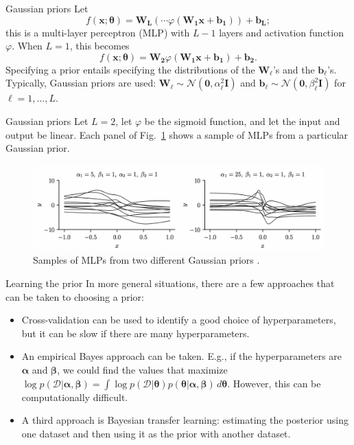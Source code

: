 \documentclass{beamer}
\begin{document}
\begin{frame}{Gaussian priors}
    Let
    \[
    f(\boldsymbol{x}; \boldsymbol{\theta}) = \boldsymbol{W_L}(\cdots\varphi(\boldsymbol{W_1}\boldsymbol{x} + \boldsymbol{b_1})) + \boldsymbol{b_L};
    \]
    this is a multi-layer perceptron (MLP) with $L - 1$ layers and activation function $\varphi$. When $L = 1$, this becomes
    \[
    f(\boldsymbol{x}; \boldsymbol{\theta}) = \boldsymbol{W_2}\varphi(\boldsymbol{W_1}\boldsymbol{x} + \boldsymbol{b_1}) + \boldsymbol{b_2}.
    \]
    Specifying a prior entails specifying the distributions of the $\boldsymbol{W}_{\ell}$'s and the $\boldsymbol{b}_{\ell}$'s. Typically, Gaussian priors are used: $\boldsymbol{W}_{\ell} \sim \mathcal{N}(\boldsymbol{0}, \alpha_{\ell}^2\boldsymbol{I})$ and $\boldsymbol{b}_{\ell} \sim \mathcal{N}(\boldsymbol{0}, \beta_{\ell}^2\boldsymbol{I})$ for $\ell = 1, \ldots, L$.
\end{frame}

\begin{frame}{Gaussian priors}
    Let $L = 2$, let $\varphi$ be the sigmoid function, and let the input and output be linear. Each panel of Fig.~\ref{fig:mlp_priors} shows a sample of MLPs from a particular Gaussian prior.
    \begin{figure}
        \centering
        \includegraphics[width=\textwidth]{mlp_priors}
        \caption{Samples of MLPs from two different Gaussian priors \cite{pml2Book}.}
        \label{fig:mlp_priors}
    \end{figure}
\end{frame}

\begin{frame}{Learning the prior}
    In more general situations, there are a few approaches that can be taken to choosing a prior:
    \begin{itemize}
        \item Cross-validation can be used to identify a good choice of hyperparameters, but it can be slow if there are many hyperparameters.
        \item An empirical Bayes approach can be taken. E.g., if the hyperparameters are $\boldsymbol{\alpha}$ and $\boldsymbol{\beta}$, we could find the values that maximize $\log p(\mathcal{D} | \boldsymbol{\alpha}, \boldsymbol{\beta}) = \int \log p(\mathcal{D} | \boldsymbol{\theta})p(\boldsymbol{\theta} | \boldsymbol{\alpha}, \boldsymbol{\beta})\,d\boldsymbol{\theta}$. However, this can be computationally difficult.
        \item A third approach is Bayesian transfer learning: estimating the posterior using one dataset and then using it as the prior with another dataset.
    \end{itemize}
\end{frame}
\end{document}
